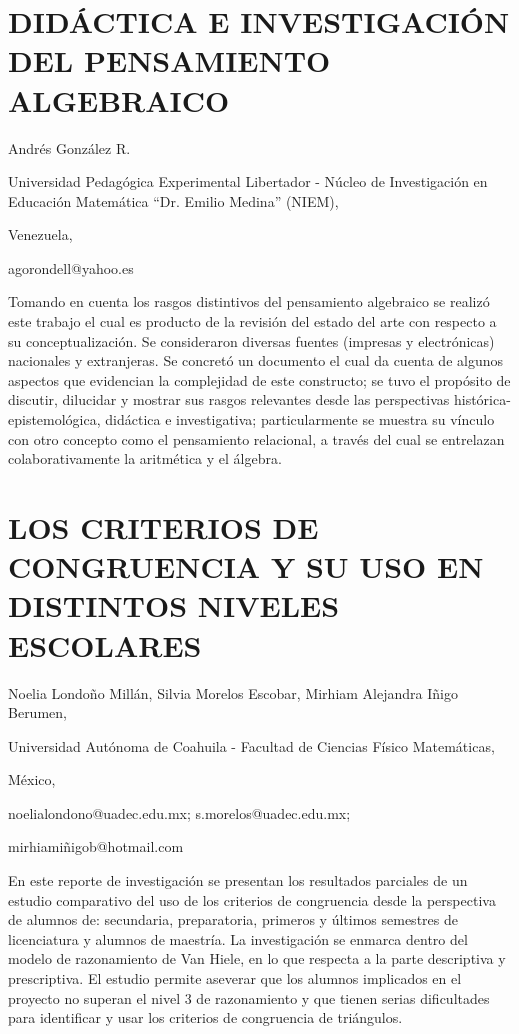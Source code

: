 \section{DIDÁCTICA E INVESTIGACIÓN DEL PENSAMIENTO ALGEBRAICO}

\begin{datos}

Andrés González R. 

Universidad Pedagógica Experimental Libertador - Núcleo de Investigación
en Educación Matemática “Dr. Emilio Medina” (NIEM), 

Venezuela,

agorondell@yahoo.es 

\end{datos}

Tomando en cuenta los rasgos distintivos del pensamiento algebraico
se realizó este trabajo el cual es producto de la revisión del estado
del arte con respecto a su conceptualización. Se consideraron diversas
fuentes (impresas y electrónicas) nacionales y extranjeras. Se concretó
un documento el cual da cuenta de algunos aspectos que evidencian
la complejidad de este constructo; se tuvo el propósito de discutir,
dilucidar y mostrar sus rasgos relevantes desde las perspectivas histórica-epistemológica,
didáctica e investigativa; particularmente se muestra su vínculo con
otro concepto como el pensamiento relacional, a través del cual se
entrelazan colaborativamente la aritmética y el álgebra. 


\section{LOS CRITERIOS DE CONGRUENCIA Y SU USO EN DISTINTOS NIVELES ESCOLARES}

\begin{datos}

Noelia Londoño Millán, Silvia Morelos Escobar, Mirhiam Alejandra Iñigo
Berumen,

Universidad Autónoma de Coahuila - Facultad de Ciencias Físico Matemáticas,

México,

noelialondono@uadec.edu.mx; s.morelos@uadec.edu.mx;

mirhiamiñigob@hotmail.com 

\end{datos}

En este reporte de investigación se presentan los resultados parciales
de un estudio comparativo del uso de los criterios de congruencia
desde la perspectiva de alumnos de: secundaria, preparatoria, primeros
y últimos semestres de licenciatura y alumnos de maestría. La investigación
se enmarca dentro del modelo de razonamiento de Van Hiele, en lo que
respecta a la parte descriptiva y prescriptiva. El estudio permite
aseverar que los alumnos implicados en el proyecto no superan el nivel
3 de razonamiento y que tienen serias dificultades para identificar
y usar los criterios de congruencia de triángulos. 


